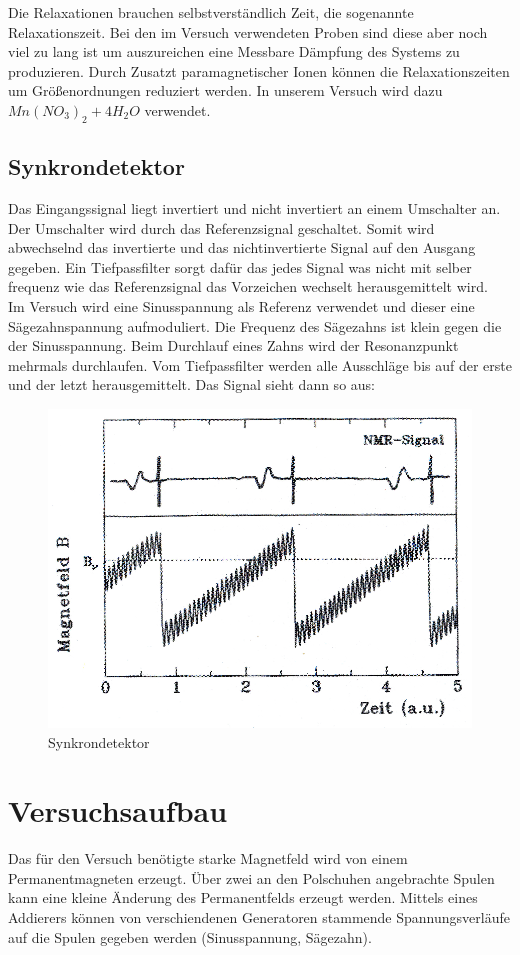 \documentclass[12pt]{article}
\begin{document}
Die Relaxationen brauchen selbstverständlich Zeit, die sogenannte Relaxationszeit. Bei den im Versuch verwendeten Proben sind diese aber noch viel zu lang ist um auszureichen eine Messbare Dämpfung des Systems zu produzieren. Durch Zusatzt paramagnetischer Ionen können die Relaxationszeiten um Größenordnungen reduziert werden. In unserem Versuch wird dazu $Mn(NO_3)_2 + 4H_2O$ verwendet.

\subsection{Synkrondetektor}
Das Eingangssignal liegt invertiert und nicht invertiert an einem Umschalter an. Der Umschalter wird durch das Referenzsignal geschaltet. Somit wird abwechselnd das invertierte und das nichtinvertierte Signal auf den Ausgang gegeben. Ein Tiefpassfilter sorgt dafür das jedes Signal was nicht mit selber frequenz wie das Referenzsignal das Vorzeichen wechselt herausgemittelt wird.\\

Im Versuch wird eine Sinusspannung als Referenz verwendet und dieser eine Sägezahnspannung aufmoduliert. Die Frequenz des Sägezahns ist klein gegen die der Sinusspannung. Beim Durchlauf eines Zahns wird der Resonanzpunkt mehrmals durchlaufen. Vom Tiefpassfilter werden alle Ausschläge bis auf der erste und der letzt herausgemittelt. Das Signal sieht dann so aus:
\begin{figure}[H]
\centering
\includegraphics[width=0.9\linewidth]{pictures/schemalockin.eps}
\caption{Synkrondetektor}
\end{figure}

\section{Versuchsaufbau}
Das für den Versuch benötigte starke Magnetfeld wird von einem Permanentmagneten erzeugt. Über zwei an den Polschuhen angebrachte Spulen kann eine kleine Änderung des Permanentfelds erzeugt werden. Mittels eines Addierers können von verschiendenen Generatoren stammende Spannungsverläufe auf die Spulen gegeben werden (Sinusspannung, Sägezahn).\\
\end{document}
